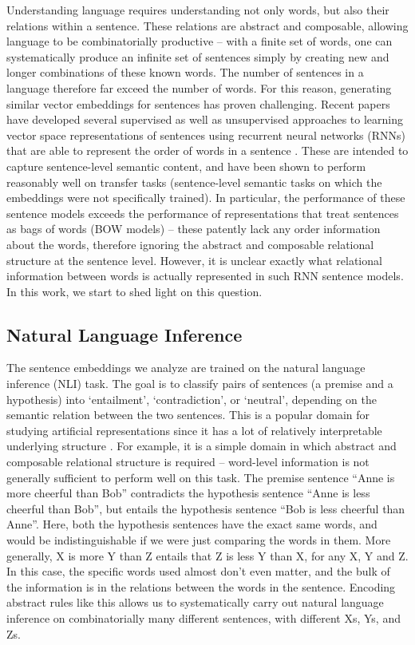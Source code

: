 Understanding language requires understanding not only words, but also their relations within a sentence. These relations are abstract and composable, allowing language to be combinatorially productive -- with a finite set of words, one can systematically produce an infinite set of sentences simply by creating new and longer combinations of these known words. The number of sentences in a language therefore far exceed the number of words. For this reason, generating similar vector embeddings for sentences has proven challenging. Recent papers have developed several supervised as well as unsupervised approaches to learning vector space representations of sentences using recurrent neural networks (RNNs) that are able to represent the order of words in a sentence \citep{kiros2015skip, Hill:2016uu, Conneau:2017uf}. These are intended to capture sentence-level semantic content, and have been shown to perform reasonably well on transfer tasks (sentence-level semantic tasks on which the embeddings were not specifically trained). In particular, the performance of these sentence models exceeds the performance of representations that treat sentences as bags of words (BOW models) -- these patently lack any order information about the words, therefore ignoring the abstract and composable relational structure at the sentence level. However, it is unclear exactly what relational information between words is actually represented in such RNN sentence models. In this work, we start to shed light on this question.

\subsection{Natural Language Inference}
The sentence embeddings we analyze are trained on the natural language inference (NLI) task. The goal is to classify pairs of sentences (a premise and a hypothesis) into `entailment', `contradiction', or `neutral', depending on the semantic relation between the two sentences. This is a popular domain for studying artificial representations since it has a lot of relatively interpretable underlying structure \citep{glockner2018breaking, mccoy2019right, nie2019analyzing}. For example, it is a simple domain in which abstract and composable relational structure is required -- word-level information is not generally sufficient to perform well on this task. The premise sentence ``Anne is more cheerful than Bob'' contradicts the hypothesis sentence ``Anne is less cheerful than Bob'', but entails the hypothesis sentence ``Bob is less cheerful than Anne''. Here, both the hypothesis sentences have the exact same words, and would be indistinguishable if we were just comparing the words in them. More generally, X is more Y than Z entails that Z is less Y than X, for any X, Y and Z. In this case, the specific words used almost don't even matter, and the bulk of the information is in the relations between the words in the sentence. Encoding abstract rules like this allows us to systematically carry out natural language inference on combinatorially many different sentences, with different Xs, Ys, and Zs.

